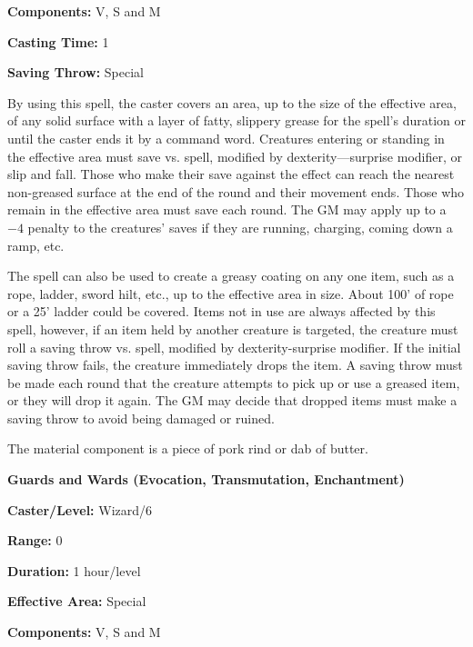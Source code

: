 \begin{multicols}{2}
\begin{minipage}{\columnwidth}
\noindent \textbf{Components:} V, S and M

\noindent \textbf{Casting Time:} 1

\noindent \textbf{Saving Throw:} Special

\end{minipage}

By using this spell, the caster covers an area, up to the size of the effective area, of any solid surface with a layer of fatty, slippery grease for the spell's duration or until the caster ends it by a command word.  Creatures entering or standing in the effective area must save vs. spell, modified by dexterity---surprise modifier, or slip and fall.  Those who make their save against the effect can reach the nearest non-greased surface at the end of the round and their movement ends.  Those who remain in the effective area must save each round.  The GM may apply up to a $-4$ penalty to the creatures' saves if they are running, charging, coming down a ramp, etc.

The spell can also be used to create a greasy coating on any one item, such as a rope, ladder, sword hilt, etc., up to the effective area in size.  About 100' of rope or a 25' ladder could be covered.  Items not in use are always affected by this spell, however, if an item held by another creature is targeted, the creature must roll a saving throw vs. spell, modified by dexterity-surprise modifier.  If the initial saving throw fails, the creature immediately drops the item. A saving throw must be made each round that the creature attempts to pick up or use a greased item, or they will drop it again.  The GM may decide that dropped items must make a saving throw to avoid being damaged or ruined.  

The material component is a piece of pork rind or dab of butter.

\vspace{1em}

\noindent
\begin{minipage}{\columnwidth}

\noindent \textbf{Guards and Wards (Evocation, Transmutation, Enchantment)}

\noindent \textbf{Caster/Level:} Wizard/6

\noindent \textbf{Range:} 0

\noindent \textbf{Duration:} 1 hour/level

\noindent \textbf{Effective Area:} Special

\noindent \textbf{Components:} V, S and M


\end{minipage}
\end{multicols}
